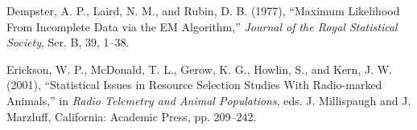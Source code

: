 \documentclass[11pt]{asaproc}
\begin{document}
\begin{references}
{\item
Dempster, A. P., Laird, N. M., and Rubin, D. B. (1977), ``Maximum Likelihood From Incomplete Data via the EM Algorithm,'' {\it Journal of the Royal Statistical Society}, Ser. B, 39, 1--38.

\item
Erickson, W. P., McDonald, T. L., Gerow, K. G., Howlin, S., and Kern, J. W. (2001), ``Statistical Issues in Resource Selection Studies With Radio-marked Animals,'' in {\it Radio Telemetry and Animal Populations}, eds. J. Millispaugh and J. Marzluff, California: Academic Press, pp. 209--242.

}
\end{references}
\end{document}
